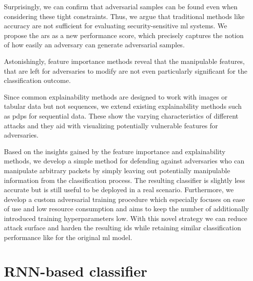 \documentclass[conference]{IEEEtran}
\begin{document}
Surprisingly, we can confirm that adversarial samples can be found even when considering these tight constraints. %
Thus, we argue that traditional methods like accuracy are not sufficient for evaluating security-sensitive \gls{ml} systems.
We propose the \acrfull{ars} as a new performance score, which precisely captures the notion of how easily an adversary can generate adversarial samples. 

Astonishingly, feature importance methods reveal that the manipulable features, that are left for adversaries to modify are not even particularly significant for the classification outcome. %

Since common explainability methods are designed to work with images or tabular data but not sequences, we extend existing explainability methods such as \glspl{pdp} \cite{friedman_greedy_2001} for sequential data. These show the varying characteristics of different attacks and they aid with visualizing potentially vulnerable features for adversaries.

Based on the insights gained by the feature importance and explainability methods, we develop a simple method for defending against adversaries who can manipulate arbitrary packets by simply leaving out potentially manipulable information from the classification process. The resulting classifier is slightly less accurate but is still useful to be deployed in a real scenario. Furthermore, we develop a custom adversarial training procedure which especially focuses on ease of use and low resource consumption and aims to keep the number of additionally introduced training hyperparameters low. With this novel strategy we can reduce attack surface and harden the resulting \gls{ids} while retaining similar classification performance like for the original \gls{ml} model. 

\section{RNN-based classifier}
\end{document}
